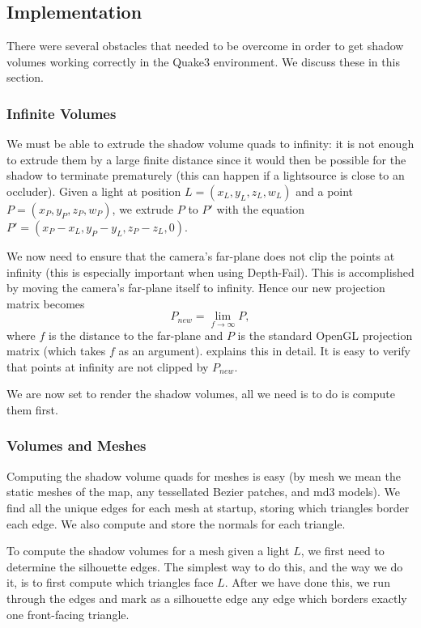 \documentclass{llncs}
\begin{document}
\begin{multicols}{2}
{\subsection{Implementation} There were several obstacles that needed to be overcome
in order to get shadow volumes working correctly in the Quake3 environment.  
We discuss these in this section.

\subsubsection{Infinite Volumes} We must be able to extrude the shadow volume quads
to infinity: it is not enough to extrude them by a large finite distance since 
it would then be possible for the shadow to terminate prematurely (this can happen
if a lightsource is close to an occluder).   Given a light at position
$L = (x_L, y_L, z_L, w_L)$ and a point $P = (x_P, y_P, z_P, w_P)$, 
we extrude $P$ to $P'$ with the equation $P'= (x_P - x_L, y_P - y_L, z_P - z_L, 0)$.

We now need to ensure that the camera's far-plane does not clip the points at infinity
(this is especially important when using Depth-Fail). This is accomplished by moving the
camera's far-plane itself to infinity.  Hence our new projection matrix becomes
\[  P_{new} = \lim_{f \rightarrow \infty}P, \]
where $f$ is the distance to the far-plane and $P$ is the standard OpenGL 
projection matrix (which takes $f$ as an argument).  
\cite{gama} explains this in detail. It is easy to
verify that points at infinity are not clipped by $P_{new}$.  

We are now set to render the shadow volumes, all we need is to do is compute them first.

\subsubsection{Volumes and Meshes} Computing the shadow volume quads for meshes is
easy (by mesh we mean the static meshes of the map, any tessellated Bezier patches, 
and md3 models).
We find all the unique edges for each mesh at startup, storing which triangles border
each edge.  We also compute and store the normals for each triangle.  

To compute the shadow volumes for a mesh given a light $L$, we first need to 
determine the silhouette edges.  The simplest way to do this, and the way we do it,
is to first compute which triangles face $L$.  After we have done this, we run through
the edges and mark as a silhouette edge any edge which borders exactly one front-facing 
triangle. 

}
\end{multicols}
\end{document}

